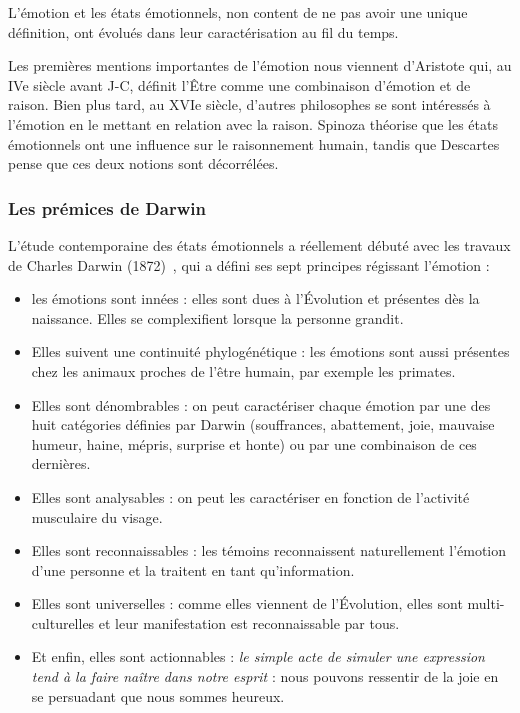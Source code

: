 L'émotion et les états émotionnels, non content de ne pas avoir une unique définition, ont évolués dans leur caractérisation au fil du temps.

Les premières mentions importantes de l'émotion nous viennent d'Aristote qui, au IVe siècle avant J-C, définit l'Être comme une combinaison d'émotion et de raison. Bien plus tard, au XVIe siècle, d'autres philosophes se sont intéressés à l'émotion en le mettant en relation avec la raison. Spinoza théorise que les états émotionnels ont une influence sur le raisonnement humain, tandis que Descartes pense que ces deux notions sont décorrélées.

\subsubsection{Les prémices de Darwin}
L'étude contemporaine des états émotionnels a réellement débuté avec les travaux de Charles Darwin (1872)~\cite{Darwin1872}, qui a défini ses sept principes régissant l'émotion :
\begin{itemize}
    \item les émotions sont innées : elles sont dues à l'Évolution et présentes dès la naissance. Elles se complexifient lorsque la personne grandit.
    \item Elles suivent une continuité phylogénétique : les émotions sont aussi présentes chez les animaux proches de l'être humain, par exemple les primates.
    \item Elles sont dénombrables : on peut caractériser chaque émotion par une des huit catégories définies par Darwin (souffrances, abattement, joie, mauvaise humeur, haine, mépris, surprise et honte) ou par une combinaison de ces dernières.
    \item Elles sont analysables : on peut les caractériser en fonction de l'activité musculaire du visage.
    \item Elles sont reconnaissables : les témoins reconnaissent naturellement l'émotion d'une personne et la traitent en tant qu'information.
    \item Elles sont universelles : comme elles viennent de l'Évolution, elles sont multi-culturelles et leur manifestation est reconnaissable par tous.
    \item Et enfin, elles sont actionnables : \textit{le simple acte de simuler une expression tend à la faire naître dans notre esprit} : nous pouvons ressentir de la joie en se persuadant que nous sommes heureux.
\end{itemize}

